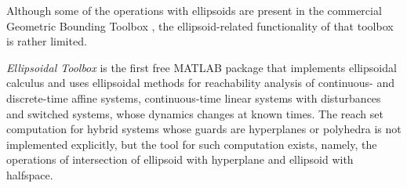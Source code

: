 Although some of the operations with ellipsoids are present in the
commercial Geometric Bounding Toolbox \cite{gbt1, gbt2}, the
ellipsoid-related functionality of that toolbox is rather limited.

{\it Ellipsoidal Toolbox} is the first free MATLAB package that
implements ellipsoidal calculus and uses ellipsoidal methods
for reachability analysis of continuous- and discrete-time affine
systems, continuous-time linear systems with disturbances and switched
systems, whose dynamics changes at known times.
The reach set computation for hybrid systems whose guards are hyperplanes
or polyhedra is not implemented explicitly, but the tool for such computation
exists, namely, the operations of intersection of ellipsoid with hyperplane
and ellipsoid with halfspace.


